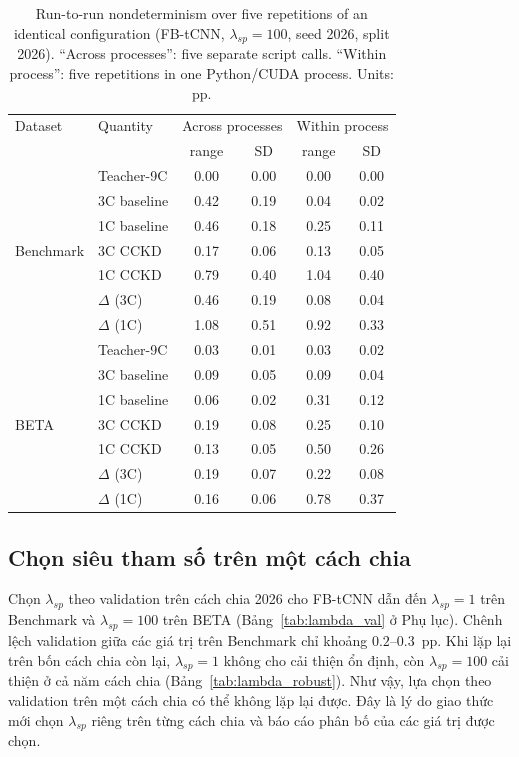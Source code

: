 \documentclass[10pt]{article} %
\begin{document}
\begin{table}[h]
\caption{Run-to-run nondeterminism over five repetitions of an identical configuration (FB-tCNN, $\lambda_{sp}=100$, seed 2026, split 2026). ``Across processes'': five separate script calls. ``Within process'': five repetitions in one Python/CUDA process. Units: pp.}
\label{tab:nondeterminism}
\begin{center}
\footnotesize
\begin{tabular}{llcccc}
\toprule
Dataset & Quantity & \multicolumn{2}{c}{Across processes} & \multicolumn{2}{c}{Within process} \\
 & & range & SD & range & SD \\
\midrule
\multirow{7}{*}{Benchmark} & Teacher-9C & 0.00 & 0.00 & 0.00 & 0.00 \\
 & 3C baseline & 0.42 & 0.19 & 0.04 & 0.02 \\
 & 1C baseline & 0.46 & 0.18 & 0.25 & 0.11 \\
 & 3C CCKD & 0.17 & 0.06 & 0.13 & 0.05 \\
 & 1C CCKD & 0.79 & 0.40 & 1.04 & 0.40 \\
 & $\Delta$ (3C) & 0.46 & 0.19 & 0.08 & 0.04 \\
 & $\Delta$ (1C) & 1.08 & 0.51 & 0.92 & 0.33 \\
\midrule
\multirow{7}{*}{BETA} & Teacher-9C & 0.03 & 0.01 & 0.03 & 0.02 \\
 & 3C baseline & 0.09 & 0.05 & 0.09 & 0.04 \\
 & 1C baseline & 0.06 & 0.02 & 0.31 & 0.12 \\
 & 3C CCKD & 0.19 & 0.08 & 0.25 & 0.10 \\
 & 1C CCKD & 0.13 & 0.05 & 0.50 & 0.26 \\
 & $\Delta$ (3C) & 0.19 & 0.07 & 0.22 & 0.08 \\
 & $\Delta$ (1C) & 0.16 & 0.06 & 0.78 & 0.37 \\
\bottomrule
\end{tabular}
\end{center}
\end{table}

\subsection{Chọn siêu tham số trên một cách chia}
\label{sec:lambda_val}

Chọn $\lambda_{sp}$ theo validation trên cách chia 2026 cho FB-tCNN dẫn đến $\lambda_{sp}=1$ trên Benchmark và $\lambda_{sp}=100$ trên BETA (Bảng~\ref{tab:lambda_val} ở Phụ lục). Chênh lệch validation giữa các giá trị trên Benchmark chỉ khoảng $0.2$--$0.3$~pp. Khi lặp lại trên bốn cách chia còn lại, $\lambda_{sp}=1$ không cho cải thiện ổn định, còn $\lambda_{sp}=100$ cải thiện ở cả năm cách chia (Bảng~\ref{tab:lambda_robust}). Như vậy, lựa chọn theo validation trên một cách chia có thể không lặp lại được. Đây là lý do giao thức mới chọn $\lambda_{sp}$ riêng trên từng cách chia và báo cáo phân bố của các giá trị được chọn.
\end{document}
